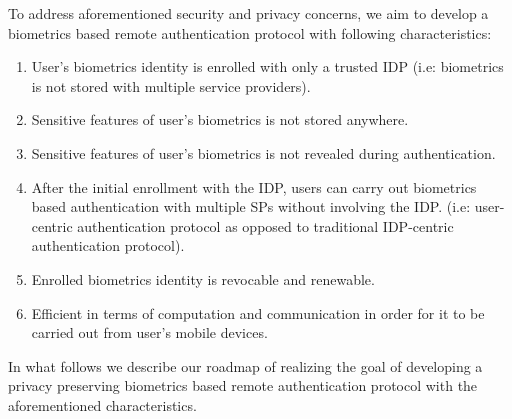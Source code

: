 \documentclass[10pt]{article}
\begin{document}
To address aforementioned security and privacy concerns, we aim to develop a biometrics based remote authentication protocol with following 
characteristics:
\begin{enumerate}
 \item User's biometrics identity is enrolled with only a trusted IDP (i.e: biometrics is not stored with multiple service providers).
 \item Sensitive features of user's biometrics is not stored anywhere.
 \item Sensitive features of user's biometrics is not revealed during authentication.
 \item After the initial enrollment with the IDP, users can carry out biometrics based authentication with multiple SPs without 
involving the IDP. (i.e: user-centric authentication protocol as opposed to traditional IDP-centric authentication protocol).
 \item Enrolled biometrics identity is revocable and renewable.
 \item Efficient in terms of computation and communication in order for it to be carried out from user's mobile devices.
\end{enumerate}

In what follows we describe our roadmap of realizing the goal of developing a privacy preserving biometrics based remote authentication protocol with 
the aforementioned characteristics.
\end{document}
